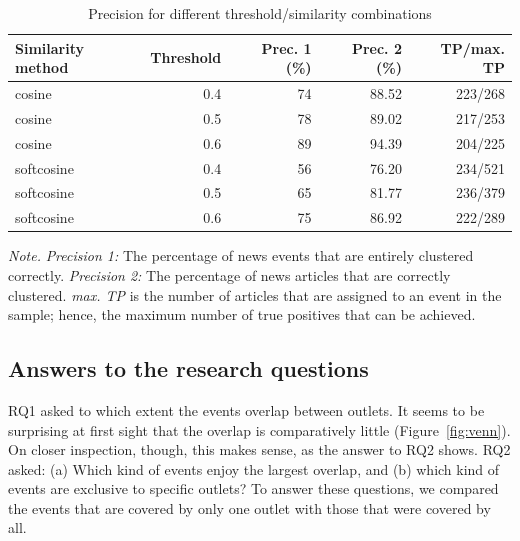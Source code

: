 \documentclass[a4paper,man,natbib,floatsintext,mask]{apa6}
\begin{document}
\begin{table}[h]
\begin{threeparttable}
\caption{Precision for different threshold/similarity combinations}
\label{tab:evaluation}

\centering
\begin{tabular}{lrrrr}
\toprule
\textbf{Similarity method}   & \textbf{Threshold} & \textbf{Prec. 1 (\%)} & \textbf{Prec. 2 (\%)} &\textbf{TP/max. TP}  \\
\midrule
cosine              & 0.4       & 74        & 88.52     & 223/268 \\
cosine              & 0.5       & 78        & 89.02     & 217/253 \\
cosine              & 0.6       & 89        & 94.39     & 204/225 \\
softcosine          & 0.4       & 56        & 76.20     & 234/521 \\
softcosine          & 0.5       & 65        & 81.77     & 236/379 \\
softcosine          & 0.6       & 75        & 86.92     & 222/289 \\
\bottomrule

\end{tabular}
\small
\textit{Note.} \textit{Precision 1:} The percentage of news events that are entirely clustered correctly. \textit{Precision 2:} The percentage of news articles that are correctly clustered. \textit{max. TP} is the number of articles that are assigned to an event in the sample; hence, the maximum number of true positives that can be achieved.

\end{threeparttable}
\end{table}



\subsection{Answers to the research questions}


RQ1 asked to which extent the events overlap between outlets.
It seems to be surprising at first sight that the overlap is comparatively little (Figure~\ref{fig:venn}).
On closer inspection, though, this makes sense, as the answer to RQ2 shows.
RQ2 asked: (a) Which kind of events enjoy the largest overlap, and (b) which kind of events are exclusive to specific outlets?
To answer these questions, we compared the events that are covered by only one outlet with those that were covered by all.
\end{document}
